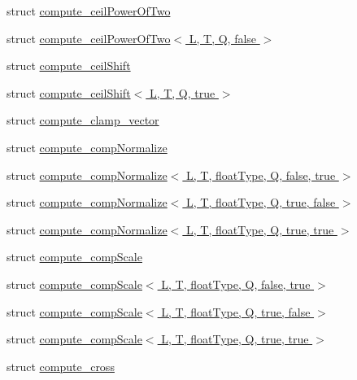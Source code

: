 \begin{DoxyCompactItemize}
struct \hyperlink{structglm_1_1detail_1_1compute__ceil_power_of_two}{compute\+\_\+ceil\+Power\+Of\+Two}
\item 
struct \hyperlink{structglm_1_1detail_1_1compute__ceil_power_of_two_3_01_l_00_01_t_00_01_q_00_01false_01_4}{compute\+\_\+ceil\+Power\+Of\+Two$<$ L, T, Q, false $>$}
\item 
struct \hyperlink{structglm_1_1detail_1_1compute__ceil_shift}{compute\+\_\+ceil\+Shift}
\item 
struct \hyperlink{structglm_1_1detail_1_1compute__ceil_shift_3_01_l_00_01_t_00_01_q_00_01true_01_4}{compute\+\_\+ceil\+Shift$<$ L, T, Q, true $>$}
\item 
struct \hyperlink{structglm_1_1detail_1_1compute__clamp__vector}{compute\+\_\+clamp\+\_\+vector}
\item 
struct \hyperlink{structglm_1_1detail_1_1compute__comp_normalize}{compute\+\_\+comp\+Normalize}
\item 
struct \hyperlink{structglm_1_1detail_1_1compute__comp_normalize_3_01_l_00_01_t_00_01float_type_00_01_q_00_01false_00_01true_01_4}{compute\+\_\+comp\+Normalize$<$ L, T, float\+Type, Q, false, true $>$}
\item 
struct \hyperlink{structglm_1_1detail_1_1compute__comp_normalize_3_01_l_00_01_t_00_01float_type_00_01_q_00_01true_00_01false_01_4}{compute\+\_\+comp\+Normalize$<$ L, T, float\+Type, Q, true, false $>$}
\item 
struct \hyperlink{structglm_1_1detail_1_1compute__comp_normalize_3_01_l_00_01_t_00_01float_type_00_01_q_00_01true_00_01true_01_4}{compute\+\_\+comp\+Normalize$<$ L, T, float\+Type, Q, true, true $>$}
\item 
struct \hyperlink{structglm_1_1detail_1_1compute__comp_scale}{compute\+\_\+comp\+Scale}
\item 
struct \hyperlink{structglm_1_1detail_1_1compute__comp_scale_3_01_l_00_01_t_00_01float_type_00_01_q_00_01false_00_01true_01_4}{compute\+\_\+comp\+Scale$<$ L, T, float\+Type, Q, false, true $>$}
\item 
struct \hyperlink{structglm_1_1detail_1_1compute__comp_scale_3_01_l_00_01_t_00_01float_type_00_01_q_00_01true_00_01false_01_4}{compute\+\_\+comp\+Scale$<$ L, T, float\+Type, Q, true, false $>$}
\item 
struct \hyperlink{structglm_1_1detail_1_1compute__comp_scale_3_01_l_00_01_t_00_01float_type_00_01_q_00_01true_00_01true_01_4}{compute\+\_\+comp\+Scale$<$ L, T, float\+Type, Q, true, true $>$}
\item 
struct \hyperlink{structglm_1_1detail_1_1compute__cross}{compute\+\_\+cross}

\end{DoxyCompactItemize}
